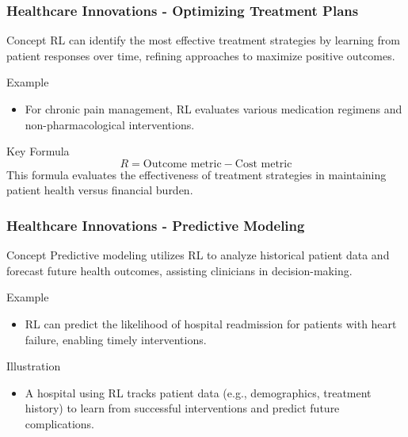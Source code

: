 \documentclass[aspectratio=169]{beamer}
\begin{document}
\begin{frame}[fragile]
    \frametitle{Healthcare Innovations - Optimizing Treatment Plans}
    \begin{block}{Concept}
        RL can identify the most effective treatment strategies by learning from patient responses over time, refining approaches to maximize positive outcomes.
    \end{block}
    \begin{exampleblock}{Example}
        \begin{itemize}
            \item For chronic pain management, RL evaluates various medication regimens and non-pharmacological interventions.
        \end{itemize}
    \end{exampleblock}
    \begin{block}{Key Formula}
        \begin{equation}
            R = \text{Outcome metric} - \text{Cost metric}
        \end{equation}
        This formula evaluates the effectiveness of treatment strategies in maintaining patient health versus financial burden.
    \end{block}
\end{frame}

\begin{frame}[fragile]
    \frametitle{Healthcare Innovations - Predictive Modeling}
    \begin{block}{Concept}
        Predictive modeling utilizes RL to analyze historical patient data and forecast future health outcomes, assisting clinicians in decision-making.
    \end{block}
    \begin{exampleblock}{Example}
        \begin{itemize}
            \item RL can predict the likelihood of hospital readmission for patients with heart failure, enabling timely interventions.
        \end{itemize}
    \end{exampleblock}
    \begin{block}{Illustration}
        \begin{itemize}
            \item A hospital using RL tracks patient data (e.g., demographics, treatment history) to learn from successful interventions and predict future complications.
        \end{itemize}
    \end{block}
\end{frame}
\end{document}
